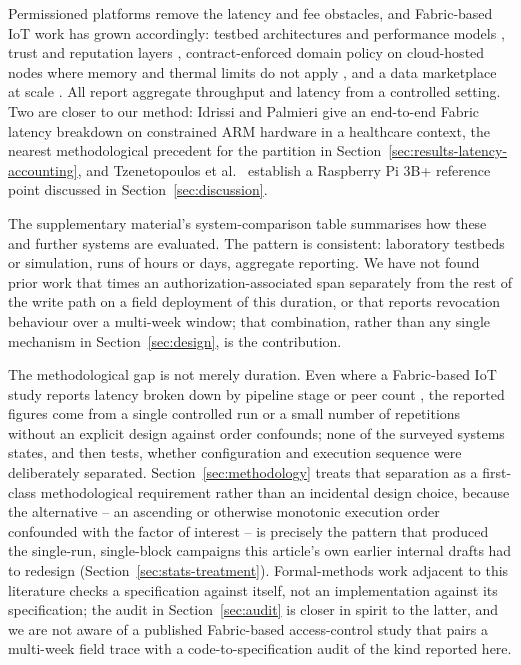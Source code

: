Permissioned platforms remove the latency and fee obstacles, and Fabric-based IoT work has grown accordingly: testbed architectures and performance models \citep{shih2022blockchainbased,pajooh2021hyperledger,ke2023performance}, trust and reputation layers \citep{putra2021trust}, contract-enforced domain policy on cloud-hosted nodes where memory and thermal limits do not apply \citep{usman2024blockchainbased}, and a data marketplace at scale \citep{gonzalez2023use}. All report aggregate throughput and latency from a controlled setting. Two are closer to our method: Idrissi and Palmieri \citep{idrissi2024blockchain} give an end-to-end Fabric latency breakdown on constrained ARM hardware in a healthcare context, the nearest methodological precedent for the partition in Section~\ref{sec:results-latency-accounting}, and Tzenetopoulos et al.\ \citep{tzenetopoulos2022hlfkubed} establish a Raspberry Pi 3B+ reference point discussed in Section~\ref{sec:discussion}.

The supplementary material's system-comparison table summarises how these and further systems \citep{zaidi2023fabrication,bandara2021fabric} are evaluated. The pattern is consistent: laboratory testbeds or simulation, runs of hours or days, aggregate reporting. We have not found prior work that times an authorization-associated span separately from the rest of the write path on a field deployment of this duration, or that reports revocation behaviour over a multi-week window; that combination, rather than any single mechanism in Section~\ref{sec:design}, is the contribution.

The methodological gap is not merely duration. Even where a Fabric-based IoT study reports latency broken down by pipeline stage \citep{idrissi2024blockchain} or peer count \citep{ke2023performance,pajooh2021hyperledger}, the reported figures come from a single controlled run or a small number of repetitions without an explicit design against order confounds; none of the surveyed systems states, and then tests, whether configuration and execution sequence were deliberately separated. Section~\ref{sec:methodology} treats that separation as a first-class methodological requirement rather than an incidental design choice, because the alternative -- an ascending or otherwise monotonic execution order confounded with the factor of interest -- is precisely the pattern that produced the single-run, single-block campaigns this article's own earlier internal drafts had to redesign (Section~\ref{sec:stats-treatment}). Formal-methods work adjacent to this literature \citep{lamport2002specifying,newcombe2015how} checks a specification against itself, not an implementation against its specification; the audit in Section~\ref{sec:audit} is closer in spirit to the latter, and we are not aware of a published Fabric-based access-control study that pairs a multi-week field trace with a code-to-specification audit of the kind reported here.

